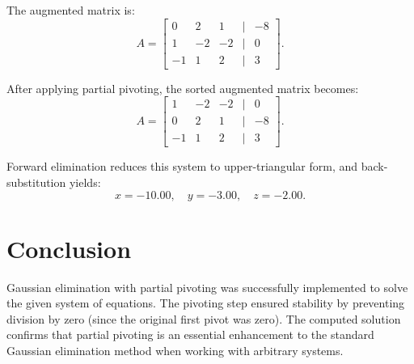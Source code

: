 The augmented matrix is:
\[
A =
\begin{bmatrix}
0 & 2 & 1 & | & -8 \\
1 & -2 & -2 & | & 0 \\
-1 & 1 & 2 & | & 3
\end{bmatrix}.
\]

After applying partial pivoting, the sorted augmented matrix becomes:
\[
A =
\begin{bmatrix}
1 & -2 & -2 & | & 0 \\
0 & 2 & 1 & | & -8 \\
-1 & 1 & 2 & | & 3
\end{bmatrix}.
\]

Forward elimination reduces this system to upper-triangular form, and back-substitution yields:
\[
x = -10.00, \quad y = -3.00, \quad z = -2.00.
\]

\section*{Conclusion} 
Gaussian elimination with partial pivoting was successfully implemented to solve the given system of equations. The pivoting step ensured stability by preventing division by zero (since the original first pivot was zero). The computed solution confirms that partial pivoting is an essential enhancement to the standard Gaussian elimination method when working with arbitrary systems.

